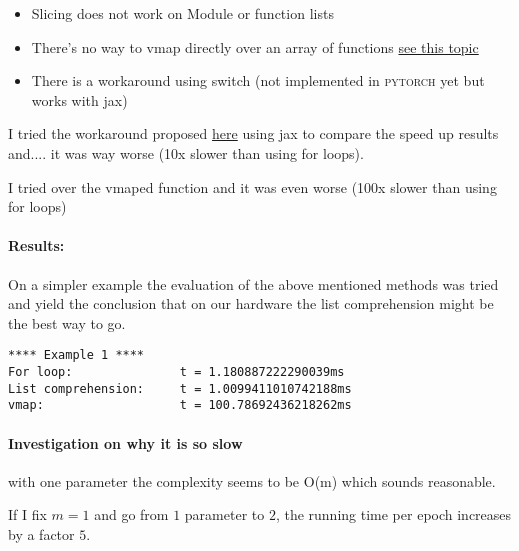 \begin{itemize}
    \item Slicing does not work on Module or function lists
    \item There's no way to vmap directly over an array of functions \href{https://github.com/google/jax/issues/673}{see this topic}
    \item There is a workaround using switch (not implemented in \textsc{pytorch} yet but works with jax)
\end{itemize}

I tried the workaround proposed \href{https://github.com/google/jax/issues/673}{here} using jax to compare the speed up results and.... it was way worse (10x slower than using for loops).

I tried  over the vmaped function and it was even worse (100x slower than using for loops)



\paragraph{Results:}
On a simpler example the evaluation of the above mentioned methods was tried and yield the conclusion that on our hardware the list comprehension might be the best way to go.
\begin{verbatim}
**** Example 1 ****
For loop:               t = 1.180887222290039ms
List comprehension:     t = 1.0099411010742188ms
vmap:                   t = 100.78692436218262ms
\end{verbatim}


\paragraph{Investigation on why it is so slow}

with one parameter the complexity seems to be O(m) which sounds reasonable.

If I fix $m=1$ and go from $1$ parameter to $2$, the running time per epoch increases by a factor $5$.


